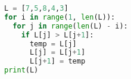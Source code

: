 
\question 
\begin{lstlisting}[language=Python]
L = [7,5,8,4,3]
for i in range(1, len(L)):
  for j in range(len(L) - i):
    if L[j] > L[j+1]:
      temp = L[j]
      L[j] = L[j+1]
      L[j+1] = temp
print(L)
\end{lstlisting}
